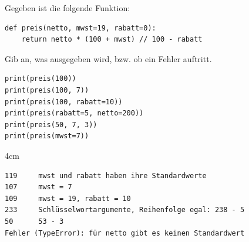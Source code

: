 \question[3]
Gegeben ist die folgende Funktion:
\begin{lstlisting}
def preis(netto, mwst=19, rabatt=0):
    return netto * (100 + mwst) // 100 - rabatt
\end{lstlisting}
Gib an, was ausgegeben wird, bzw. ob ein Fehler auftritt.
\begin{lstlisting}
print(preis(100))
print(preis(100, 7))
print(preis(100, rabatt=10))
print(preis(rabatt=5, netto=200))
print(preis(50, 7, 3))
print(preis(mwst=7))
\end{lstlisting}

\begin{solutionbox}{4cm}
\begin{lstlisting}[language={}]
119     mwst und rabatt haben ihre Standardwerte
107     mwst = 7
109     mwst = 19, rabatt = 10
233     Schlüsselwortargumente, Reihenfolge egal: 238 - 5
50      53 - 3
Fehler (TypeError): für netto gibt es keinen Standardwert
\end{lstlisting}
\end{solutionbox}
